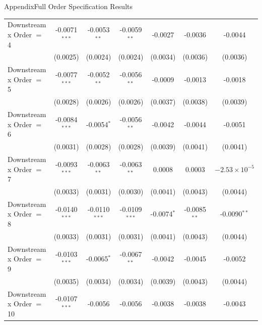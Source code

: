 \documentclass[aspectratio=169,11pt,dvipsnames, handout]{beamer}
\begin{document}
\begin{frame}{\textcolor{defaultclr!30}{Appendix}\hspace{0.75em}Full Order Specification Results}
\begin{adjustbox}{width=0.45\textwidth, center}
\begin{tabular}{lcccccc}
      Downstream x Order $=$ 4  & -0.0071$^{***}$ & -0.0053$^{**}$          & -0.0059$^{**}$                 & -0.0027         & -0.0036                       & -0.0044\\   
                                & (0.0025)        & (0.0024)                & (0.0024)                       & (0.0034)        & (0.0036)                      & (0.0036)\\   
      Downstream x Order $=$ 5  & -0.0077$^{***}$ & -0.0052$^{**}$          & -0.0056$^{**}$                 & -0.0009         & -0.0013                       & -0.0018\\   
                                & (0.0028)        & (0.0026)                & (0.0026)                       & (0.0037)        & (0.0038)                      & (0.0039)\\   
      Downstream x Order $=$ 6  & -0.0084$^{***}$ & -0.0054$^{*}$           & -0.0056$^{**}$                 & -0.0042         & -0.0044                       & -0.0051\\   
                                & (0.0031)        & (0.0028)                & (0.0028)                       & (0.0039)        & (0.0041)                      & (0.0041)\\   
      Downstream x Order $=$ 7  & -0.0093$^{***}$ & -0.0063$^{**}$          & -0.0063$^{**}$                 & 0.0008          & 0.0003                        & $-2.53\times 10^{-5}$\\    
                                & (0.0033)        & (0.0031)                & (0.0030)                       & (0.0041)        & (0.0043)                      & (0.0044)\\   
      Downstream x Order $=$ 8  & -0.0140$^{***}$ & -0.0110$^{***}$         & -0.0109$^{***}$                & -0.0074$^{*}$   & -0.0085$^{**}$                & -0.0090$^{**}$\\   
                                & (0.0033)        & (0.0031)                & (0.0031)                       & (0.0041)        & (0.0043)                      & (0.0044)\\   
      Downstream x Order $=$ 9  & -0.0103$^{***}$ & -0.0065$^{*}$           & -0.0067$^{**}$                 & -0.0042         & -0.0045                       & -0.0052\\   
                                & (0.0035)        & (0.0034)                & (0.0034)                       & (0.0039)        & (0.0043)                      & (0.0044)\\   
      Downstream x Order $=$ 10 & -0.0107$^{***}$ & -0.0056                 & -0.0056                        & -0.0038         & -0.0038                       & -0.0043\\   

\end{tabular}
\end{adjustbox}
\end{frame}
\end{document}
